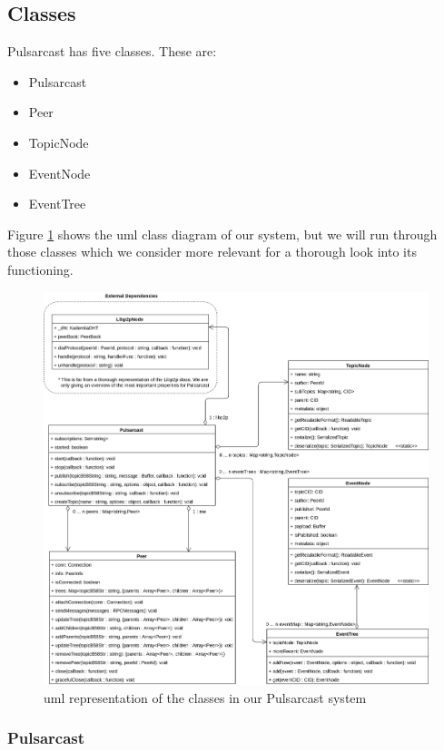 \subsection{Classes}\label{subsec:classes}

Pulsarcast has five classes. These are:

\begin{itemize}
  \item
    Pulsarcast
  \item
		Peer
  \item
    TopicNode
  \item
    EventNode
  \item
    EventTree
\end{itemize}

Figure \ref{fig:pulsarcast-uml} shows the \acrfull{uml} class diagram of our
system, but we will run through those classes which we consider more relevant
for a thorough look into its functioning.

\begin{figure}[hb!]
  \center
  \includegraphics[width=1\textwidth]{img/uml-pulsarcast.png}
  \caption{\acrshort{uml} representation of the classes in our Pulsarcast system}
  \label{fig:pulsarcast-uml}
\end{figure}

\subsubsection{Pulsarcast}\label{subsubsec:pulsarcast}

